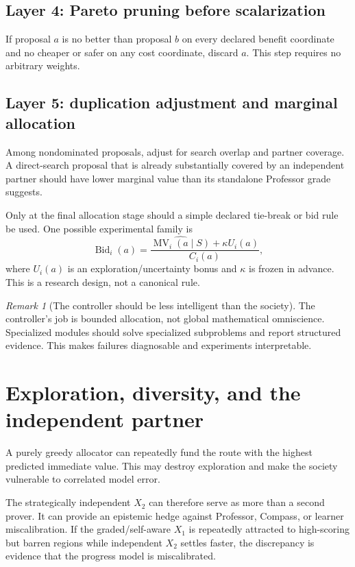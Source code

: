 \documentclass[11pt]{article}
\theoremstyle{definition}
\theoremstyle{remark}
\newtheorem{remark}[theorem]{Remark}
\newcommand{\marg}{\operatorname{MV}}
\begin{document}
\subsection{Layer 4: Pareto pruning before scalarization}

If proposal $a$ is no better than proposal $b$ on every declared benefit coordinate and no cheaper or safer on any cost coordinate, discard $a$. This step requires no arbitrary weights.

\subsection{Layer 5: duplication adjustment and marginal allocation}

Among nondominated proposals, adjust for search overlap and partner coverage. A direct-search proposal that is already substantially covered by an independent partner should have lower marginal value than its standalone Professor grade suggests.

Only at the final allocation stage should a simple declared tie-break or bid rule be used. One possible experimental family is
\[
\operatorname{Bid}_i(a)
=
\frac{\widehat{\marg_i(a\mid S)}+\kappa U_i(a)}{C_i(a)},
\]
where $U_i(a)$ is an exploration/uncertainty bonus and $\kappa$ is frozen in advance. This is a research design, not a canonical rule.

\begin{remark}[The controller should be less intelligent than the society]
The controller's job is bounded allocation, not global mathematical omniscience. Specialized modules should solve specialized subproblems and report structured evidence. This makes failures diagnosable and experiments interpretable.
\end{remark}

\section{Exploration, diversity, and the independent partner}

A purely greedy allocator can repeatedly fund the route with the highest predicted immediate value. This may destroy exploration and make the society vulnerable to correlated model error.

The strategically independent $X_2$ can therefore serve as more than a second prover. It can provide an epistemic hedge against Professor, Compass, or learner miscalibration. If the graded/self-aware $X_1$ is repeatedly attracted to high-scoring but barren regions while independent $X_2$ settles faster, the discrepancy is evidence that the progress model is miscalibrated.
\end{document}
